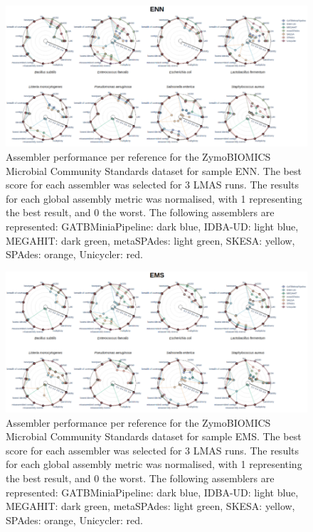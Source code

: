 \begin{figure}[]
\centering
\includegraphics[width=\textwidth]{figures/chapter 5/Supplemental Figure 4.png}
\caption{Assembler performance per reference for the ZymoBIOMICS Microbial Community Standards dataset for sample ENN. The best score for each assembler was selected for 3 LMAS runs. The results for each global assembly metric was normalised, with 1 representing the best result, and 0 the worst. The following assemblers are represented: GATBMiniaPipeline: dark blue, IDBA-UD: light blue, MEGAHIT: dark green, metaSPAdes: light green, SKESA: yellow, SPAdes: orange, Unicycler: red.}
\label{fig:chap5_sup_figure_4}
\end{figure}

\begin{figure}[]
\centering
\includegraphics[width=\textwidth]{figures/chapter 5/Supplemental Figure 5.png}
\caption{Assembler performance per reference for the ZymoBIOMICS Microbial Community Standards dataset for sample EMS. The best score for each assembler was selected for 3 LMAS runs. The results for each global assembly metric was normalised, with 1 representing the best result, and 0 the worst. The following assemblers are represented: GATBMiniaPipeline: dark blue, IDBA-UD: light blue, MEGAHIT: dark green, metaSPAdes: light green, SKESA: yellow, SPAdes: orange, Unicycler: red.}
\label{fig:chap5_sup_figure_5}
\end{figure}

